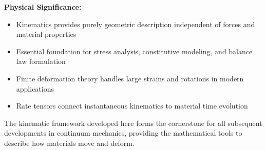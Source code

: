 \begin{subox}[Summary]
\textbf{Physical Significance:}
\begin{itemize}
\item Kinematics provides purely geometric description independent of forces and material properties
\item Essential foundation for stress analysis, constitutive modeling, and balance law formulation
\item Finite deformation theory handles large strains and rotations in modern applications
\item Rate tensors connect instantaneous kinematics to material time evolution
\end{itemize}

The kinematic framework developed here forms the cornerstone for all subsequent developments in continuum mechanics, providing the mathematical tools to describe how materials move and deform.
\end{subox}